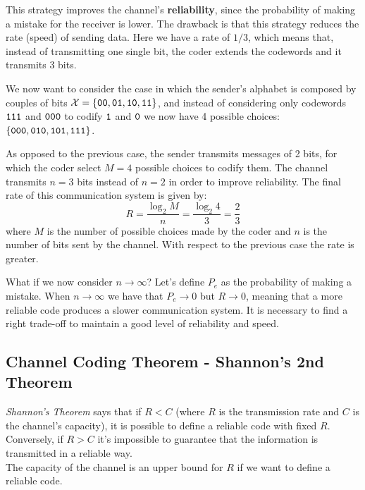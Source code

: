 This strategy improves the channel's \textbf{reliability}, since the probability of making a mistake for the receiver is lower. The drawback is that this strategy reduces the rate (speed) of sending data. Here we have a rate of $1/3$, which means that, instead of transmitting one single bit, the coder extends the codewords and it transmits 3 bits.


We now want to consider the case in which the sender's alphabet is composed by couples of bits $\mathcal{X} = \{\verb|00|,\verb|01|,\verb|10|,\verb|11|\}$, and instead of considering only codewords $\verb|111|$ and $\verb|000|$ to codify $\verb|1|$ and $\verb|0|$ we now have 4 possible choices: $\{\verb|000|, \verb|010|, \verb|101|, \verb|111|\}$.

As opposed to the previous case, the sender transmits messages of 2 bits, for which the coder select $M = 4$ possible choices to codify them. The channel transmits $n = 3$ bits instead of $n = 2$ in order to improve reliability. The final rate of this communication system is given by:
$$R = \frac{\log_2 M}{n} = \frac{\log_2 4}{3} = \frac{2}{3}$$
where $M$ is the number of possible choices made by the coder and $n$ is the number of bits sent by the channel. With respect to the previous case the rate is greater.

What if we now consider $n \rightarrow \infty$? Let's define $P_e$ as the probability of making a mistake.
When $n \rightarrow \infty$ we have that $P_e \rightarrow 0$ but $R \rightarrow 0$, meaning that a more reliable code produces a slower communication system.
It is necessary to find a right trade-off to maintain a good level of reliability and speed.


\subsection{Channel Coding Theorem - Shannon's 2nd Theorem}
\textit{Shannon's Theorem} says that if $R < C$ (where $R$ is the transmission rate and $C$ is the channel's capacity), it is possible to define a reliable code with fixed $R$. Conversely, if $R > C$ it's impossible to guarantee that the information is transmitted in a reliable way.\\
The capacity of the channel is an upper bound for $R$ if we want to define a reliable code.

